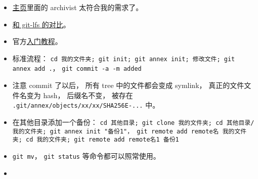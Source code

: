 
\begin{itemize}
\item \href{https://git-annex.branchable.com/}{主页}里面的 archivist 太符合我的需求了。
\item \href{https://stackoverflow.com/questions/39337586/how-do-git-lfs-and-git-annex-differ}{和 git-lfs 的对比}。
\item 官方\href{https://git-annex.branchable.com/walkthrough/}{入门教程}。
\item 标准流程： \verb|cd 我的文件夹; git init; git annex init; 修改文件; git annex add .|， \verb|git commit -a -m added|
\item 注意 commit 了以后， 所有 tree 中的文件都会变成 symlink， 真正的文件文件名变为 hash， 后缀名不变， 被存在 \verb|.git/annex/objects/xx/xx/SHA256E-...| 中。
\item 在其他目录添加一个备份： \verb|cd 其他目录; git clone 我的文件夹; cd 其他目录/我的文件夹; git annex init "备份1"， git remote add remote名 我的文件夹; cd 我的文件夹; git remote add remote名1 备份1|
\item \verb|git mv|， \verb|git status| 等命令都可以照常使用。
\item 
\end{itemize}
